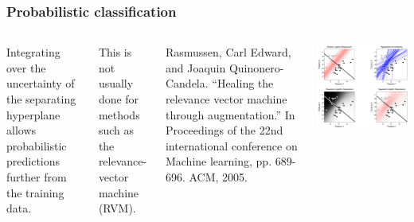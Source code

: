 \begin{frame}
\frametitle{Probabilistic classification}
\begin{columns}[c]
Integrating over the uncertainty of the separating hyperplane allows probabilistic predictions further from the training data.\par
This is not usually done for methods such as the relevance-vector machine (RVM).\par
\vspace{0.25cm}
\begin{tiny}
Rasmussen, Carl Edward, and Joaquin Quinonero-Candela. ``Healing the relevance vector machine through augmentation.'' In Proceedings of the 22nd international conference on Machine learning, pp. 689-696. ACM, 2005.\par
\end{tiny}
\includegraphics[width=\textwidth]{logistic_regr}
\end{columns}
\end{frame}


